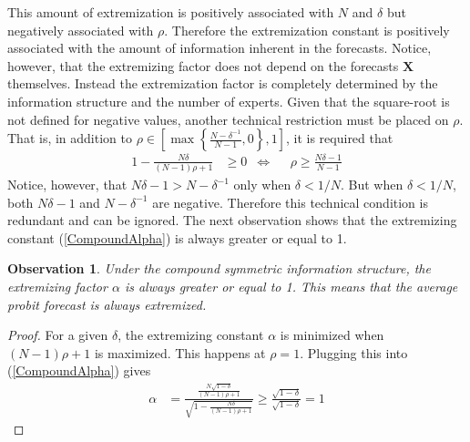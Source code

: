 \documentclass[11pt,twoside]{article}
\newtheorem{observation}[theorem]{Observation}
\theoremstyle{definition}
\theoremstyle{definition}
\begin{document}
This amount of extremization is positively associated with $N$ and $\delta$ but negatively associated with $\rho$. Therefore the extremization constant is positively associated with the amount of information inherent in the forecasts. Notice, however, that the extremizing factor does not depend on the forecasts $\boldsymbol{X}$ themselves. Instead  the extremization factor is completely determined by the information structure and the number of experts. Given that the square-root is not defined for negative values, another technical restriction must be placed on $\rho$. That is, in addition to $\rho \in \left[  \max \left\{ \frac{N-\delta^{-1}}{N-1}, 0\right\}, 1 \right]$, it is required that
\begin{align*}
1- \frac{N\delta}{(N-1)\rho +1}  &\geq 0 &\Leftrightarrow&& \rho \geq \frac{N\delta - 1}{N-1}
\end{align*}
Notice, however, that $N\delta - 1 > N - \delta^{-1}$ only when $\delta < 1/N$. But when $\delta < 1/N$, both $N\delta - 1$ and $N - \delta^{-1}$ are negative. Therefore this technical condition is redundant and can be ignored. The next observation shows that the extremizing constant  (\ref{CompoundAlpha}) is always greater or equal to 1.  

\begin{observation}
\label{positiveThm}
Under the compound symmetric information structure, the extremizing factor $\alpha$ is always greater or equal to 1. This means that the average probit forecast is always extremized. 
\end{observation}
\begin{proof} 
For a given $\delta$, the extremizing constant $\alpha$ is minimized when $(N-1)\rho +1$ is maximized. This happens at $\rho = 1$. Plugging this into (\ref{CompoundAlpha}) gives
\begin{align*}
\alpha &= \frac{\frac{N\sqrt{1-\delta}}{(N-1)\rho +1}}{\sqrt{1- \frac{N\delta}{(N-1)\rho +1} }}  \geq \frac{\sqrt{1-\delta}}{\sqrt{1-\delta }} = 1
\end{align*}
\end{proof}
\end{document}
